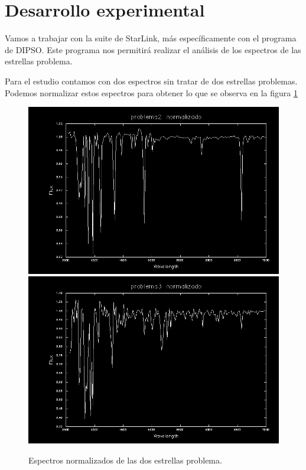 \documentclass{aa} %
\begin{document}
\section{Desarrollo experimental}

Vamos a trabajar con la suite de StarLink, más específicamente con el programa de DIPSO. Este programa nos permitirá realizar el análisis de los espectros de las estrellas problema.

Para el estudio contamos con dos espectros sin tratar de dos estrellas problemas. Podemos normalizar estos espectros para obtener lo que se observa en la figura \ref{fig:espectroNorm}

\begin{figure}[h!]
\begin{center}
\includegraphics[scale=0.15]{Problema2 normalizado.png}
\includegraphics[scale=0.15]{Problema3 normalizado.png}
\caption{Espectros normalizados de las dos estrellas problema.}
\label{fig:espectroNorm}
\end{center}
\end{figure}
\end{document}
